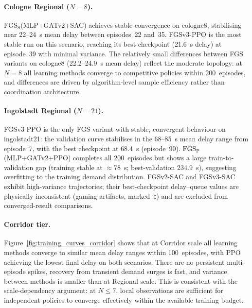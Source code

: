 \paragraph{Cologne Regional ($N=8$).}
$\text{FGS}_\text{S}$(MLP+GATv2+SAC) achieves stable convergence on cologne8, stabilising near 22--24~s mean delay between episodes~22 and~35. FGSv3-PPO is the most stable run on this scenario, reaching its best checkpoint (21.6~s delay) at episode~39 with minimal variance. The relatively small differences between FGS variants on cologne8 (22.2--24.9~s mean delay) reflect the moderate topology: at $N=8$ all learning methods converge to competitive policies within 200~episodes, and differences are driven by algorithm-level sample efficiency rather than coordination architecture.

\paragraph{Ingolstadt Regional ($N=21$).}
FGSv3-PPO is the only FGS variant with stable, convergent behaviour on ingolstadt21: the validation curve stabilises in the 68--85~s mean delay range from episode~7, with the best checkpoint at 68.4~s (episode~90). $\text{FGS}_\text{P}$(MLP+GATv2+PPO) completes all 200~episodes but shows a large train-to-validation gap (training stable at $\approx$78~s; best-validation 234.9~s), suggesting overfitting to the training demand distribution. FGSv2-SAC and FGSv3-SAC exhibit high-variance trajectories; their best-checkpoint delay--queue values are physically inconsistent (gaming artifacts, marked~$\ddagger$) and are excluded from converged-result comparisons.

\paragraph{Corridor tier.}
Figure~\ref{fig:training_curves_corridor} shows that at Corridor scale all learning methods converge to similar mean delay ranges within 100~episodes, with PPO achieving the lowest final delay on both scenarios. There are no persistent multi-episode spikes, recovery from transient demand surges is fast, and variance between methods is smaller than at Regional scale. This is consistent with the scale-dependency argument: at $N \leq 7$, local observations are sufficient for independent policies to converge effectively within the available training budget.

